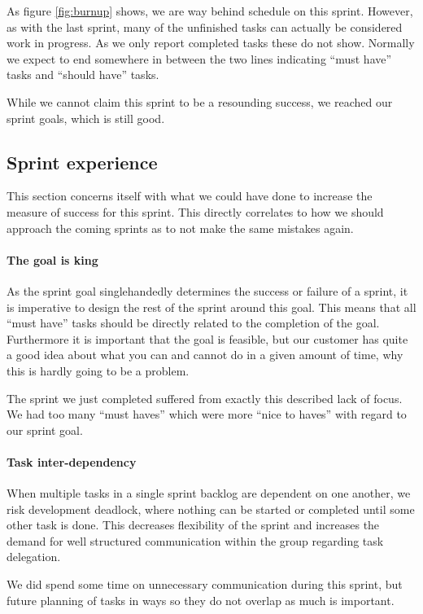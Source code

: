 \documentclass[a4paper]{article}
\begin{document}
As figure \ref{fig:burnup} shows, we are way behind schedule on this sprint.
However, as with the last sprint, many of the unfinished tasks can actually
be considered work in progress. As we only report completed tasks these do not
show. Normally we expect to end somewhere in between the two lines indicating
``must have'' tasks and ``should have'' tasks.

While we cannot claim this sprint to be a resounding success, we reached our
sprint goals, which is still good.

\subsection{Sprint experience}
This section concerns itself with what we could have done to increase the
measure of success for this sprint. This directly correlates to how we should
approach the coming sprints as to not make the same mistakes again.

\paragraph{The goal is king}
As the sprint goal singlehandedly determines the success or failure of a sprint,
it is imperative to design the rest of the sprint around this goal. This means
that all ``must have'' tasks should be directly related to the completion of the
goal. Furthermore it is important that the goal is feasible, but our customer
has quite a good idea about what you can and cannot do in a given amount of
time, why this is hardly going to be a problem.

The sprint we just completed suffered from exactly this described lack of focus.
We had too many ``must haves'' which were more ``nice to haves'' with regard to
our sprint goal.

\paragraph{Task inter-dependency}
When multiple tasks in a single sprint backlog are dependent on one another, we
risk development deadlock, where nothing can be started or completed until some
other task is done. This decreases flexibility of the sprint and increases the
demand for well structured communication within the group regarding task
delegation.

We did spend some time on unnecessary communication during this sprint, but
future planning of tasks in ways so they do not overlap as much is important.
\end{document}
